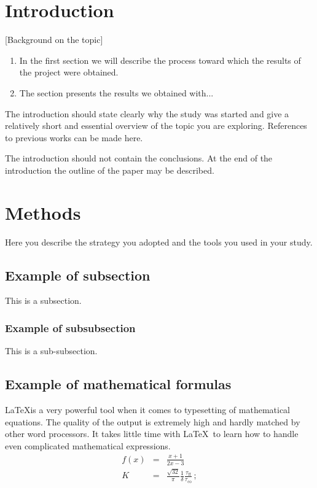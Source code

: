 \documentclass[a4paper,10pt]{article}
\begin{document}


\section{Introduction}
[Background on the topic]

\begin{enumerate}
\item In the first section we will describe the process toward which the results of the project were obtained.
\item The section presents the results we obtained with...
\end{enumerate}

The introduction should state clearly why the study was started
and give a relatively short and essential overview of the topic
you are exploring. References to previous works can be made here.
 
The introduction should not contain the conclusions. 
At the end of the introduction the outline of the paper may be described.
 
 
\section{Methods}
Here you describe the strategy you adopted and the tools you
used in your study.
\subsection{Example of subsection}
This is a subsection.
\subsubsection{Example of subsubsection}
This is a sub-subsection.

\subsection{Example of mathematical formulas}
\LaTeX is a very powerful tool when it comes to typesetting of
mathematical equations. The quality of the output is extremely
high and hardly matched by other word processors. It takes little
time with {\LaTeX\,}  to learn how to handle 
even complicated mathematical expressions.
   \begin{eqnarray}
       f(x)& = & \frac{x + 1}{2x-3}\\
      K        & = & \frac{\sqrt{32}}{\pi} \frac{1}{\delta}
                        \frac{ \tau_{\mathrm{ff}} }
                             { \tau_{\mathrm{co}} } \nonumber \,;
   \end{eqnarray}
\end{document}
